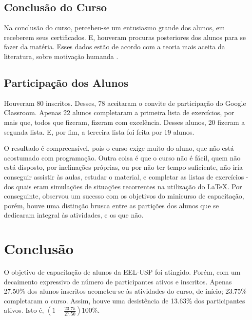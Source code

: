 \documentclass[
12pt,				%
openright,			%
oneside,			%
a4paper,			%
english,			%
french,				%
spanish,			%
brazil,				%
]{abntex2}
\begin{document}
\section{Conclusão do Curso}

Na conclusão do curso, percebeu-se um entusiasmo grande dos alunos, em receberem seus certificados. E, houveram procuras posteriores dos alunos para se fazer da matéria. Esses dados estão de acordo com a teoria mais aceita da literatura, sobre motivação humanda \cite{hendijani2016intrinsic}.


\section{Participação dos Alunos}

Houveram 80 inscritos. Desses, 78 aceitaram o
convite de participação do Google Classroom. Apenas 22 alunos
completaram a primeira lista de exercícios, por mais que, todos que
fizeram, fizeram com excelência. Desses alunos, 20 fizeram a segunda
lista. E, por fim, a terceira lista foi feita por 19 alunos.

O resultado é compreensível, pois o curso exige muito do aluno, que
não está acostumado com programação. Outra coisa é que o curso não é
fácil, quem não está disposto, por
inclinações próprias, ou por não ter tempo suficiente, não iria
conseguir assistir às aulas, estudar o material, e completar as listas
de exercícios - dos quais eram simulações de situações recorrentes na
utilização do \LaTeX. Por conseguinte, observou um sucesso com os
objetivos do minicurso de capacitação, porém, houve uma distinção brusca entre as
partições dos alunos que se dedicaram integral às atividades, e os que
não.


\chapter{Conclusão}

O objetivo de capacitação de alunos da EEL-USP foi atingido. Porém,
com um decaimento expressivo de número de participantes ativos e
inscritos. Apenas 27.50\% dos alunos inscritos acometeu-se às atividades
do curso, de início; 23.75\%  completaram o curso. Assim, houve uma desistência de 13.63\% dos participantes ativos. Isto é, $(1-\frac{23.75}{27.50})100\%$.
\end{document}
